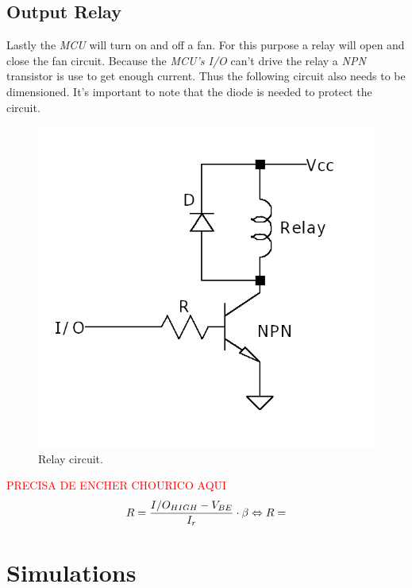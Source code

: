 \documentclass[12pt]{article}
\begin{document}
\subsection{Output Relay }
    
    Lastly the \textit{MCU} will turn on and off a fan. For this purpose 
    a relay will open and close the fan circuit. Because the \textit{MCU's I/O} 
    can't drive the relay a \textit{NPN} transistor is use to get enough current.
    Thus the following circuit also needs to be dimensioned. It's important to note
    that the diode is needed to protect the circuit.
    
    \begin{figure}[H] 
        \centering
        \includegraphics*[scale = 0.4]{images/RelayDrive.png}
        \caption{Relay circuit.}
        \label{wrap-fig:1}
    \end{figure}
    \textcolor{red}{PRECISA DE ENCHER CHOURICO AQUI}
    \begin{equation}
        R = \frac{I/O_{HIGH}-V_{BE}}{I_r}\cdot \beta\\
        \Leftrightarrow R = 
    \end{equation}


\newpage
\section{Simulations}
\end{document}
